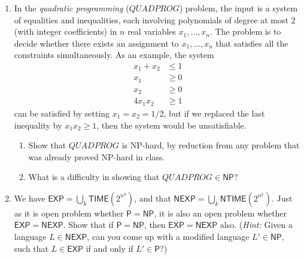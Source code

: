 \documentclass[11pt]{article}
\begin{document}
\begin{enumerate}
\item In the \emph{quadratic programming} ($QUADPROG$) problem, the input is a system of equalities and inequalities, each involving polynomials of degree at most $2$ (with integer coefficients) in $n$ real variables $x_1, \ldots , x_n$. The problem is to decide whether there exists an assignment to $x_1, \ldots , x_n$ that satisfies all the constraints simultaneously. As an example, the system
\begin{align*}
x_1 + x_2 &\leq 1 \\
x_1 &\geq 0 \\
x_2 &\geq 0 \\
4x_1x_2 &\geq 1
\end{align*}
can be satisfied by setting $x_1 = x_2 = 1/2$, but if we replaced the last inequality by $x_1x_2 \geq 1$, then the system would be unsatisfiable.
\begin{enumerate}
\item Show that $QUADPROG$ is \textsf{NP}-hard, by reduction from any problem that was already proved \textsf{NP}-hard in class.
\item What is a difficulty in showing that $QUADPROG \in \textsf{NP}$?
\end{enumerate}

\item We have $\mathsf{EXP} = \bigcup_k \mathsf{TIME}\left( 2^{n^k} \right)$, and that $\mathsf{NEXP} = \bigcup_k \mathsf{NTIME} \left( 2^{n^k} \right)$. Just as it is open problem
whether $\mathsf{P} = \mathsf{NP}$, it is also an open problem whether $\mathsf{EXP} = \mathsf{NEXP}$. Show that if $\mathsf{P} = \mathsf{NP}$, then $\mathsf{EXP} = \mathsf{NEXP}$ also. (\emph{Hint:} Given a language $L \in \mathsf{NEXP}$, can you come up with a modified language
$L' \in \mathsf{NP}$, such that $L \in \mathsf{EXP}$ if and only if $L' \in \mathsf{P}$?)

\end{enumerate}
\end{document}
